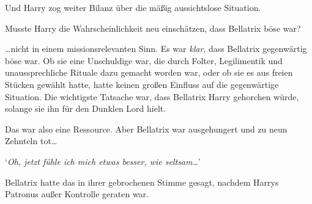 Und Harry zog weiter Bilanz über die mäßig aussichtslose Situation.

Musste Harry die Wahrscheinlichkeit neu einschätzen, dass Bellatrix böse war?

…nicht in einem missionsrelevanten Sinn. Es war \emph{klar}, dass Bellatrix gegenwärtig böse war. Ob sie eine Unschuldige war, die durch Folter, Legilimentik und unaussprechliche Rituale dazu gemacht worden war, oder ob sie es aus freien Stücken gewählt hatte, hatte keinen großen Einfluss auf die gegenwärtige Situation. Die wichtigste Tatsache war, dass Bellatrix Harry gehorchen würde, solange sie ihn für den Dunklen Lord hielt.

Das war also eine Ressource. Aber Bellatrix war ausgehungert und zu neun Zehnteln tot…

`\emph{Oh, jetzt fühle ich mich etwas besser, wie seltsam…}'

Bellatrix hatte das in ihrer gebrochenen Stimme gesagt, nachdem Harrys Patronus außer Kontrolle geraten war.

